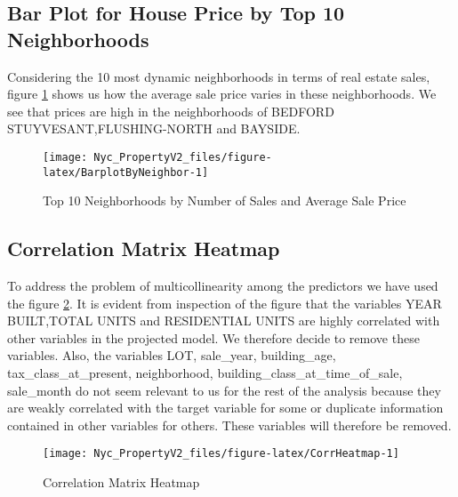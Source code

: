 \documentclass[
]{article}
\begin{document}
\hypertarget{bar-plot-for-house-price-by-top-10-neighborhoods}{%
\subsection{Bar Plot for House Price by Top 10 Neighborhoods}\label{bar-plot-for-house-price-by-top-10-neighborhoods}}

Considering the 10 most dynamic neighborhoods in terms of real estate sales, figure \ref{fig:BarplotByNeighbor} shows us how the average sale price varies in these neighborhoods. We see that prices are high in the neighborhoods of BEDFORD STUYVESANT,FLUSHING-NORTH and BAYSIDE.

\begin{figure}[H]

{\centering \texttt{[image: Nyc\_PropertyV2\_files/figure-latex/BarplotByNeighbor-1]} 

}

\caption{Top 10 Neighborhoods by Number of Sales and Average Sale Price}\label{fig:BarplotByNeighbor}
\end{figure}

\hypertarget{correlation-matrix-heatmap}{%
\subsection{Correlation Matrix Heatmap}\label{correlation-matrix-heatmap}}

To address the problem of multicollinearity among the predictors we have used the figure \ref{fig:CorrHeatmap}. It is evident from inspection of the figure that the variables YEAR BUILT,TOTAL UNITS and RESIDENTIAL UNITS are highly correlated with other variables in the projected model. We therefore decide to remove these variables. Also, the variables LOT, sale\_year, building\_age, tax\_class\_at\_present, neighborhood, building\_class\_at\_time\_of\_sale, sale\_month do not seem relevant to us for the rest of the analysis because they are weakly correlated with the target variable for some or duplicate information contained in other variables for others. These variables will therefore be removed.

\begin{figure}[H]

{\centering \texttt{[image: Nyc\_PropertyV2\_files/figure-latex/CorrHeatmap-1]} 

}

\caption{Correlation Matrix Heatmap}\label{fig:CorrHeatmap}
\end{figure}
\end{document}
